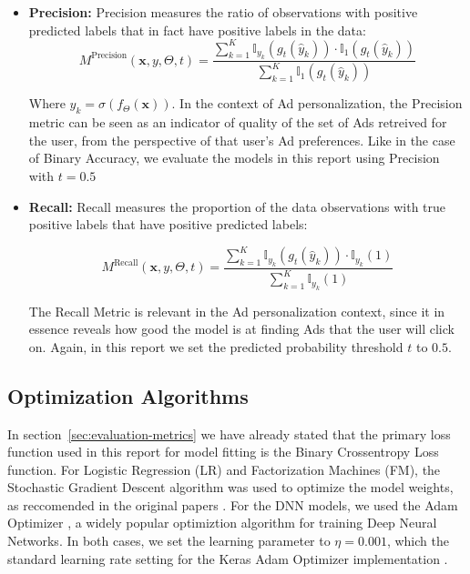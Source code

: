 \documentclass{mldsmsc}
\begin{document}
\begin{itemize}
    \item \textbf{Precision:} Precision measures the ratio of observations with positive predicted labels
    that in fact have positive labels in the data:
    \[
    M^{\text{Precision}}(\mathbf{x},y,\Theta,t) =
    \frac{ \sum_{k=1}^{K} \mathbb{I}_{y_k}(g_{t}(\hat{y}_k)) \cdot \mathbb{I}_{1}(g_{t}(\hat{y}_k))}{\sum_{k=1}^{K}\mathbb{I}_{1}(g_{t}(\hat{y}_k))}
    \]

    Where $\hat{y}_k = \sigma(f_{\Theta}(\mathbf{x}))$. In the context of Ad personalization, the Precision metric can be seen as an indicator of quality
    of the set of Ads retreived for the user, from the perspective of that user's Ad preferences. Like
    in the case of Binary Accuracy, we evaluate the models in this report using Precision with $t=0.5$
    \item \textbf{Recall:} Recall measures the proportion of the data observations with true positive
    labels that have positive predicted labels:

    \[
        M^{\text{Recall}}(\mathbf{x},y,\Theta,t) =
        \frac{ \sum_{k=1}^{K} \mathbb{I}_{y_k}(g_{t}(\hat{y}_k)) \cdot \mathbb{I}_{y_k}(1)}{\sum_{k=1}^{K}\mathbb{I}_{y_k}(1)}
    \]

    The Recall Metric is relevant in the Ad personalization context, since it in essence reveals how good
    the model is at finding Ads that the user will click on. Again, in this report we set the predicted
    probability threshold $t$ to $0.5$.
\end{itemize}

\subsection{Optimization Algorithms}
\label{sec:optimization-algorithms}

In section~\ref{sec:evaluation-metrics} we have already stated that the primary loss function used in this report
for model fitting is the Binary Crossentropy Loss function. For Logistic Regression (LR) and Factorization Machines (FM),
the Stochastic Gradient Descent algorithm \citep{robbins1951stochastic} was used to optimize the model weights,
as reccomended in the original papers \citep{RefWorks:richardson2007predicting,RefWorks:rendle2010factorization}.
For the DNN models, we used the Adam Optimizer \citep{Kingma2014AdamAM}, a widely popular optimiztion algorithm
for training Deep Neural Networks. In both cases, we set the learning parameter to $\eta = 0.001$, which the
standard learning rate setting for the Keras Adam Optimizer implementation \citep{chollet2023keras}.
\end{document}
